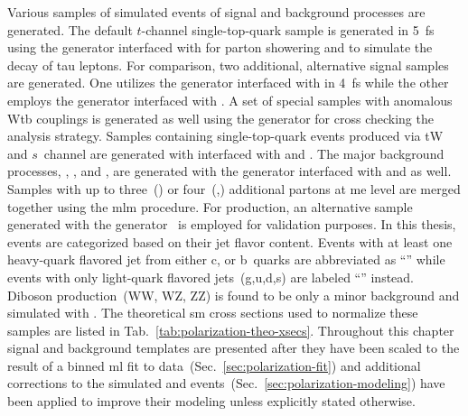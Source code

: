 Various samples of simulated events of signal and background processes are generated. The default $t$-channel single-top-quark sample is generated in 5~\gls{fs} using the \POWHEG generator interfaced with  for parton showering and \TAUOLA to simulate the decay of tau leptons. For comparison, two additional, alternative signal samples are generated. One utilizes the \AMC generator interfaced with  in 4~\gls{fs} while the other employs the \COMPHEP generator interfaced with . A set of special samples with anomalous Wtb couplings is generated as well using the \COMPHEP generator for cross checking the analysis strategy. Samples containing single-top-quark events produced via tW and $s$~channel are generated with \POWHEG interfaced with  and \TAUOLA. The major background processes, \wjets, \zjets, and \ttbar, are generated with the \MG generator interfaced with  and \TAUOLA as well. Samples with up to three~(\ttbar) or four~(\wjets,\zjets) additional partons at \gls{me} level are merged together using the \gls{mlm} procedure. For \wjets production, an alternative sample generated with the \SHERPA[format=hyperbf] generator~\cite{Hoeche:2012ft} is employed for validation purposes. In this thesis, \wjets events are categorized based on their jet flavor content. Events with at least one heavy-quark flavored jet from either c, or b~quarks are abbreviated as ``'' while events with only light-quark flavored jets~(g,u,d,s) are labeled ``'' instead. Diboson production~(WW, WZ, ZZ) is found to be only a minor background and simulated with . The theoretical \gls{sm} cross sections used to normalize these samples are listed in Tab.~\ref{tab:polarization-theo-xsecs}. Throughout this chapter signal and background templates are presented after they have been scaled to the result of a binned \gls{ml} fit to data~(Sec.~\ref{sec:polarization-fit}) and additional corrections to the simulated \wjets and \ttbar events~(Sec.~\ref{sec:polarization-modeling}) have been applied to improve their modeling unless explicitly stated otherwise.


